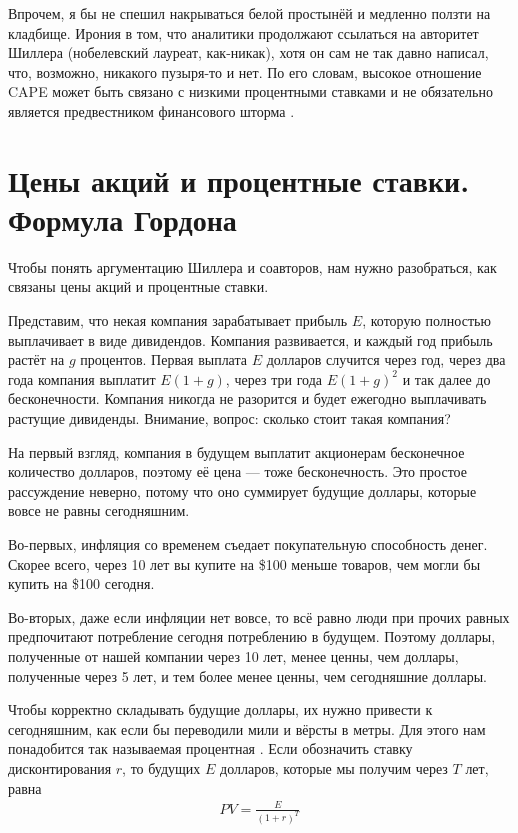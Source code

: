 Впрочем, я бы не спешил накрываться белой простынёй и медленно ползти на кладбище. Ирония в том, что аналитики продолжают ссылаться на авторитет Шиллера (нобелевский лауреат, как-никак), хотя он сам не так давно написал, что, возможно, никакого пузыря-то и нет. По его словам, высокое отношение CAPE может быть связано с низкими процентными ставками и не обязательно является предвестником финансового шторма \cite{shiller2020cape}.

\section*{Цены акций и процентные ставки. Формула Гордона}

Чтобы понять аргументацию Шиллера и соавторов, нам нужно разобраться, как связаны цены акций и процентные ставки.

Представим, что некая компания зарабатывает прибыль $E$, которую полностью выплачивает в виде дивидендов. Компания развивается, и каждый год прибыль растёт на $g$ процентов. Первая выплата $E$ долларов случится через год, через два года компания выплатит $E(1+g)$, через три года $E(1+g)^2$ и так далее до бесконечности. Компания никогда не разорится и будет ежегодно выплачивать  растущие дивиденды. Внимание, вопрос: сколько стоит такая компания?

На первый взгляд, компания в будущем выплатит акционерам бесконечное количество долларов, поэтому её цена --- тоже бесконечность. Это простое рассуждение неверно, потому что оно суммирует будущие доллары, которые вовсе не равны сегодняшним.

Во-первых, инфляция со временем съедает покупательную способность денег. Скорее всего, через 10 лет вы купите на \$100 меньше товаров, чем могли бы купить на \$100 сегодня.

Во-вторых, даже если инфляции нет вовсе, то всё равно люди при прочих равных предпочитают потребление сегодня потреблению в будущем. Поэтому доллары, полученные от нашей компании через 10 лет, менее ценны, чем доллары, полученные через 5 лет, и тем более менее ценны, чем сегодняшние доллары.

Чтобы корректно складывать будущие доллары, их нужно привести к сегодняшним, как если бы переводили мили и вёрсты в метры. Для этого нам понадобится так называемая процентная . Если обозначить ставку дисконтирования $r$, то  будущих $E$ долларов, которые мы получим через $T$ лет, равна
\begin{align*}
PV = \frac{E}{(1 +r)^T}
\end{align*}

